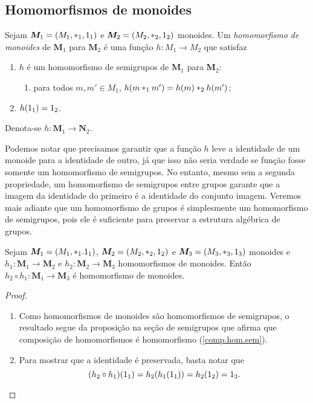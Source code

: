 \subsection{Homomorfismos de monoides}

\begin{definition}
Sejam $\bm M_1=(M_1,\ast_1,1_1)$ e $\bm M_2=(M_2,\ast_2,1_2)$ monoides. Um \emph{homomorfismo de monoides} de $\bm M_1$ para $\bm M_2$ é uma função $h: M_1 \to M_2$ que satisfaz
	\begin{enumerate}
	\item $h$ é um homomorfismo de semigrupos de $\bm M_1$ para $\bm M_2$:
		\begin{enumerate}
		\item para todos $m,m' \in M_1$, $h(m \ast_1 m')=h(m) \ast_2 h(m')$;
		\end{enumerate}
	\item $h(1_1)=1_2$.
	\end{enumerate}
\noindent Denota-se $h: \bm M_1 \to \bm N_2$. %
\end{definition}

Podemos notar que precisamos garantir que a função $h$ leve a identidade de um monoide para a identidade de outro, já que isso não seria verdade se função fosse somente um homomorfismo de semigrupos. No entanto, mesmo sem a segunda propriedade, um homomorfismo de semigrupos entre grupos garante que a imagem da identidade do primeiro é a identidade do conjunto imagem. Veremos mais adiante que um homomorfismo de grupos é simplesmente um homomorfismo de semigrupos, pois ele é suficiente para preservar a estrutura algébrica de grupos.

\begin{proposition}
\label{comp.hom.mon}
Sejam $\bm M_1=(M_1,\ast_1.1_1)$, $\bm M_2=(M_2,\ast_2,1_2)$ e $\bm M_3=(M_3,\ast_3,1_3)$ monoides e $h_1: \bm M_1 \to \bm M_2$ e $h_2: \bm M_2 \to \bm M_3$ homomorfismos de monoides. Então $h_2 \circ h_1: \bm M_1 \to \bm M_3$ é homomorfismo de monoides.
\end{proposition}
\begin{proof}
	\begin{enumerate}
	\item Como homomorfismos de monoides são homomorfismos de semigrupos, o resultado segue da proposição na seção de semigrupos que afirma que composição de homomorfismos é homomorfismo (\ref{comp.hom.sem}).
	\item Para mostrar que a identidade é preservada, basta notar que
	\begin{equation*}
	(h_2 \circ h_1)(1_1) = h_2(h_1(1_1)) = h_2(1_2) = 1_3.
	\end{equation*}
	\end{enumerate}
\end{proof}